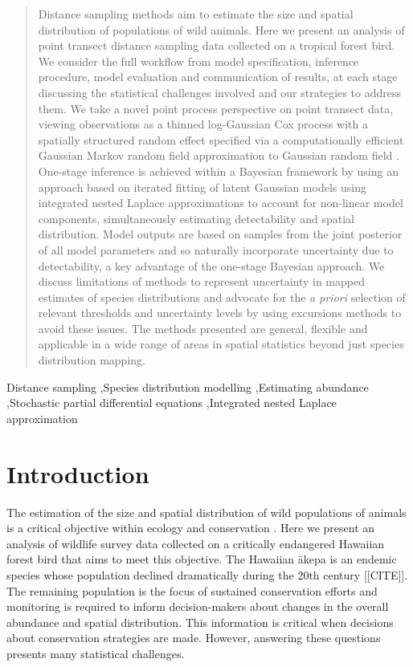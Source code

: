 \documentclass[preprint,12pt]{elsarticle}
\newcommand{\akepa}{\textquotesingle\={a}kepa}  %
\begin{document}
\begin{frontmatter}
\begin{abstract}
Distance sampling methods aim to estimate the size and spatial distribution of populations of wild animals.  Here we present an analysis of point transect distance sampling data collected on a tropical forest bird.  We consider the full workflow from model specification, inference procedure, model evaluation and communication of results, at each stage discussing the statistical challenges involved and our strategies to address them.  We take a novel point process perspective on point transect data, viewing observations as a thinned log-Gaussian Cox process with a spatially structured random effect specified via a computationally efficient Gaussian Markov random field approximation to Gaussian random field \citep{lindgren_explicit_2011}.  One-stage inference is achieved within a Bayesian framework by using an approach based on iterated fitting of latent Gaussian models using integrated nested Laplace approximations \citep{rue_approximate_2009} to account for non-linear model components, simultaneously estimating detectability and spatial distribution.  Model outputs are based on samples from the joint posterior of all model parameters and so naturally incorporate uncertainty due to detectability, a key advantage of the one-stage Bayesian approach.  We discuss limitations of methods to represent uncertainty in mapped estimates of species distributions and advocate for the \textit{a priori} selection of relevant thresholds and uncertainty levels by using excursions methods \citep{bolin_excursion_2015} to avoid these issues. The methods presented are general, flexible and applicable in a wide range of areas in spatial statistics beyond just species distribution mapping.
\bigskip
\end{abstract}

\begin{keyword}
Distance sampling \sep Species distribution modelling \sep Estimating abundance \sep Stochastic partial differential equations \sep Integrated nested Laplace approximation
\bigskip
\end{keyword}
\end{frontmatter}

\section{Introduction}

The estimation of the size and spatial distribution of wild populations of animals is a critical objective within ecology and conservation \citep{schwarz_estimating_1999}. Here we present an analysis of wildlife survey data collected on a critically endangered Hawaiian forest bird that aims to meet this objective.  The Hawaiian \akepa{} is an endemic species whose population declined dramatically during the 20th century [[CITE]].  The remaining population is the focus of sustained conservation efforts and monitoring is required to inform decision-makers about changes in the overall abundance and spatial distribution.  This information is critical when decisions about conservation strategies are made.  However, answering these questions presents many statistical challenges.  
\end{document}
